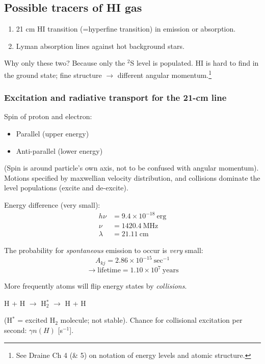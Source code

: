 \documentclass[11pt]{article}
\newcommand{\mar}[1]{\hspace{0pt}\marginpar{-\textcolor{black}{#1}-}}
\begin{document}
\subsection{Possible tracers of HI gas}
\begin{enumerate}[topsep=-1ex]
    \item 21 cm HI transition (=hyperfine transition) in emission or absorption.
    \item Lyman absorption lines against hot background stars.
\end{enumerate}
Why only these two? Because only the $^{2}$S level is populated. HI is hard to
find in the ground state; fine structure $\rightarrow$ different angular
momentum.\footnote{
    See Draine Ch 4 (\& 5) on notation of energy levels and
    atomic structure.}

\subsubsection{Excitation and radiative transport for the 21-cm line}
\mar{34}Spin of proton and electron:
\begin{itemize}[topsep=-1ex]
    \item Parallel (upper energy)
    \item Anti-parallel (lower energy)
\end{itemize}

(Spin is around particle's own axis, not to be confused with angular
momentum). Motions specified by maxwellian velocity distribution, and
collisions dominate the level populations (excite and de-excite).

Energy difference (very small):
\begin{align*}
    h\nu &= 9.4\times10^{-18}\:\mathrm{erg}\\
    \nu &= 1420.4\:\mathrm{MHz}\\
    \lambda &= 21.11\:\mathrm{cm}
\end{align*}


The probability for \emph{spontaneous} emission to occur is \emph{very} small:
\[
    A_{kj} = 2.86\times10^{-15}\:\mathrm{sec}^{-1}
    \]
\[
    \rightarrow \mathrm{lifetime} = 1.10\times10^{7}\:\mathrm{years}
    \]

More frequently atoms will flip energy states by \emph{collisions}.
\begin{center}
    H + H $\rightarrow$ H$_{2}^{*}$ $\rightarrow$ H + H\\
\end{center}
(H$^{*}$ = excited H$_{2}$ molecule; not stable).
Chance for collisional excitation per second: $\gamma n(H)$ [s$^{-1}$].
\end{document}
